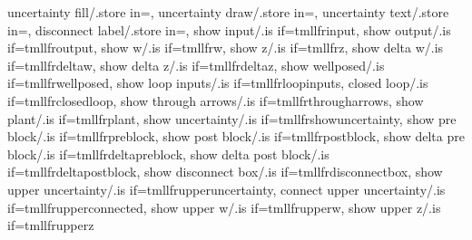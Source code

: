 {  uncertainty fill/.store in=\tmllfruncertaintyfill,
  uncertainty draw/.store in=\tmllfruncertaintydraw,
  uncertainty text/.store in=\tmllfruncertaintytext,
  disconnect label/.store in=\tmllfrdisconnectlabel,
  show input/.is if=tmllfrinput,
  show output/.is if=tmllfroutput,
  show w/.is if=tmllfrw,
  show z/.is if=tmllfrz,
  show delta w/.is if=tmllfrdeltaw,
  show delta z/.is if=tmllfrdeltaz,
  show wellposed/.is if=tmllfrwellposed,
  show loop inputs/.is if=tmllfrloopinputs,
  closed loop/.is if=tmllfrclosedloop,
  show through arrows/.is if=tmllfrthrougharrows,
  show plant/.is if=tmllfrplant,
  show uncertainty/.is if=tmllfrshowuncertainty,
  show pre block/.is if=tmllfrpreblock,
  show post block/.is if=tmllfrpostblock,
  show delta pre block/.is if=tmllfrdeltapreblock,
  show delta post block/.is if=tmllfrdeltapostblock,
  show disconnect box/.is if=tmllfrdisconnectbox,
  show upper uncertainty/.is if=tmllfrupperuncertainty,
  connect upper uncertainty/.is if=tmllfrupperconnected,
  show upper w/.is if=tmllfrupperw,
  show upper z/.is if=tmllfrupperz
}

